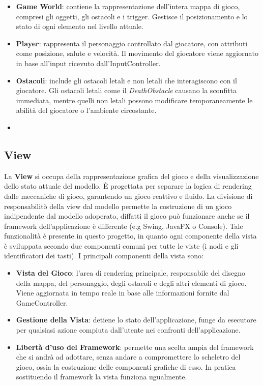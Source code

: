 \documentclass[a4paper,12pt]{report}
\begin{document}
	\begin{itemize} \item \textbf{Game World}: contiene la rappresentazione dell’intera mappa di gioco, compresi gli oggetti, gli ostacoli e i trigger. Gestisce il posizionamento e lo stato di ogni elemento nel livello attuale. 
		
		\item \textbf{Player}: rappresenta il personaggio controllato dal giocatore, con attributi come posizione, salute e velocità. Il movimento del giocatore viene aggiornato in base all’input ricevuto dall’InputController. 
		
		\item \textbf{Ostacoli}: include gli ostacoli letali e non letali che interagiscono con il giocatore. Gli ostacoli letali come il \textit{DeathObstacle} causano la sconfitta immediata, mentre quelli non letali possono modificare temporaneamente le abilità del giocatore o l’ambiente circostante. \item  \end{itemize}
	
	\subsection{View}
	
	La \textbf{View} si occupa della rappresentazione grafica del gioco e della visualizzazione dello stato attuale del modello. È progettata per separare la logica di rendering dalle meccaniche di gioco, garantendo un gioco reattivo e fluido. La divisione di responsabilitò della view dal modello permette la costruzione di un gioco indipendente dal modello adoperato, diffatti il gioco può funzionare anche se il framework dell'applicazione è differente (e.g Swing, JavaFX o Console). Tale funzionalità è presente in questo progetto, in quanto ogni componente della vista è sviluppata secondo due componenti comuni per tutte le viste (i nodi e gli identificatori dei tasti).
	I principali componenti della vista sono:
	
	\begin{itemize} \item \textbf{Vista del Gioco}: l’area di rendering principale, responsabile del disegno della mappa, del personaggio, degli ostacoli e degli altri elementi di gioco. Viene aggiornata in tempo reale in base alle informazioni fornite dal GameController. 
		
		\item \textbf{Gestione della Vista}: detiene lo stato dell'applicazione, funge da esecutore per qualsiasi azione compiuta dall'utente nei confronti dell'applicazione. 
		
		\item \textbf{Libertà d'uso del Framework}: permette una scelta ampia del framework che si andrà ad adottare, senza andare a compromettere lo scheletro del gioco, ossia la costruzione delle componenti grafiche di esso. In pratica sostituendo il framework la vista funziona ugualmente.
		
	\end{itemize}
	
\end{document}
